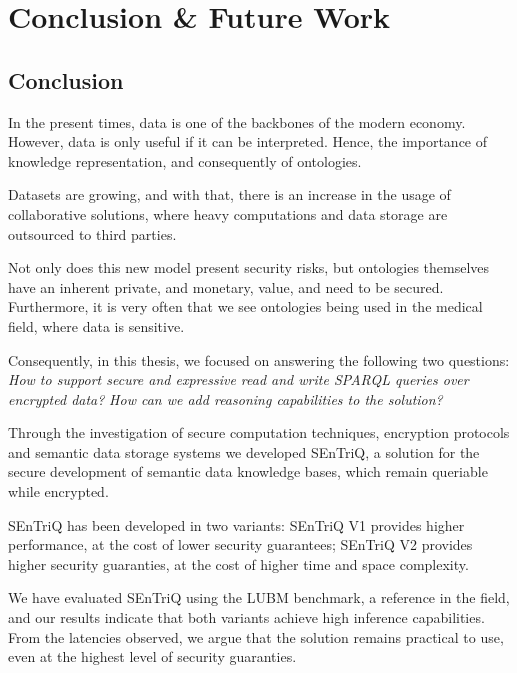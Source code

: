 
\chapter{Conclusion \& Future Work}
\label{cha:conclusion-and-future-work}


\section{Conclusion}
\label{sec:conclusion}

In the present times, data is one of the backbones of the modern economy. However, data is only useful if it can be interpreted. Hence, the importance of knowledge representation, and consequently of ontologies.

Datasets are growing, and with that, there is an increase in the usage of collaborative solutions, where heavy computations and data storage are outsourced to third parties.

Not only does this new model present security risks, but ontologies themselves have an inherent private, and monetary, value, and need to be secured. Furthermore, it is very often that we see ontologies being used in the medical field, where data is sensitive. 

Consequently, in this thesis, we focused on answering the following two questions: \emph{How to support secure and expressive read and write \gls{SPARQL} queries over encrypted data?} \emph{How can we add reasoning capabilities to the solution?}

Through the investigation of secure computation techniques, encryption protocols and semantic data storage systems we developed \gls{SEnTriQ}, a solution for the secure development of semantic data knowledge bases, which remain queriable while encrypted.

\gls{SEnTriQ} has been developed in two variants: \gls{SEnTriQ} V1 provides higher performance, at the cost of lower security guarantees; \gls{SEnTriQ} V2 provides higher security guaranties, at the cost of higher time and space complexity.

We have evaluated \gls{SEnTriQ} using the \gls{LUBM} benchmark, a reference in the field, and our results indicate that both variants achieve high inference capabilities. From the latencies observed, we argue that the solution remains practical to use, even at the highest level of security guaranties.

